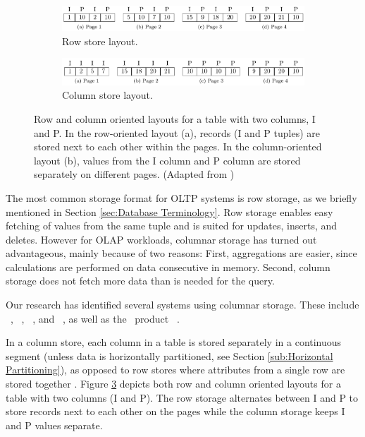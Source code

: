 \begin{figure}
  \centering
  \begin{subfigure}{\textwidth}
    \includegraphics[width=\textwidth]{img/row-store.png}
    \caption{Row store layout.}
    \label{fig:row-column-store-1} 
  \end{subfigure}
  \begin{subfigure}{\textwidth}
    \includegraphics[width=\textwidth]{img/column-store.png}
    \caption{Column store layout.}
    \label{fig:row-column-store-2} 
  \end{subfigure}
  \caption{Row and column oriented layouts for a table with two columns, I and P. In the row-oriented layout (a), records (I and P tuples) are stored next to each other within the pages. In the column-oriented layout (b), values from the I column and P column are stored separately on different pages. (Adapted from \cite{Bjorklund2011-wh})}
  \label{fig:row-column-store} 
\end{figure}

The most common storage format for OLTP systems is row storage, as we briefly mentioned in Section \ref{sec:Database Terminology}. Row storage enables easy fetching of values from the same tuple and is suited for updates, inserts, and deletes. However for OLAP workloads, columnar storage has turned out advantageous, mainly because of two reasons: First, aggregations are easier, since calculations are performed on data consecutive in memory. Second, column storage does not fetch more data than is needed for the query.

Our research has identified several systems using columnar storage. These include \monetdb~\cite{Boncz2005-wj, Boncz2002-yj}, \cstore~\cite{Stonebraker2005-qz}, \saph~\cite{Farber2012-vh}, and \mssql~\cite{noauthor_undated-vq, Larson2013-mc}, as well as the \bd~product \tableau~\cite{Kamkolkar2015-iq}.

In a column store, each column in a table is stored separately in a continuous segment (unless data is horizontally partitioned, see Section \ref{sub:Horizontal Partitioning}), as opposed to row stores where attributes from a single row are stored together \cite{Bjorklund2011-wh}. Figure \ref{fig:row-column-store} depicts both row and column oriented layouts for a table with two columns (I and P). The row storage alternates between I and P to store records next to each other on the pages while the column storage keeps I and P values separate. 

